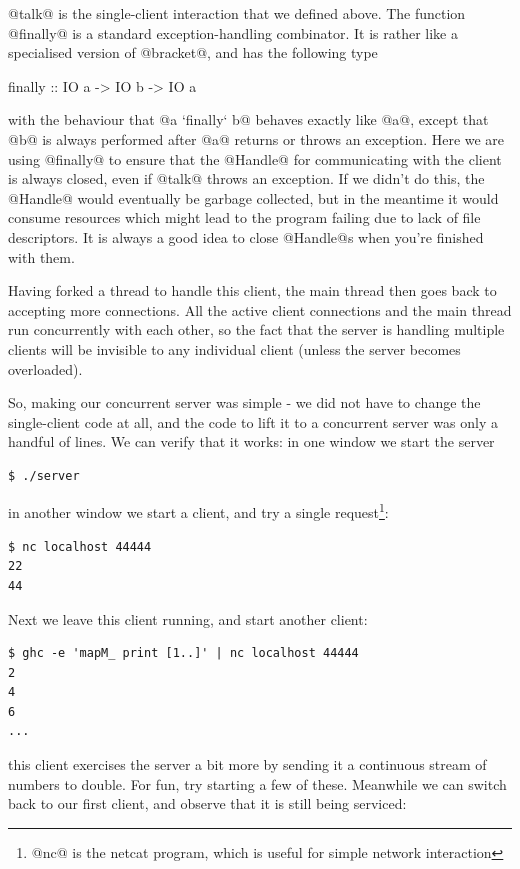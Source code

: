 \noindent @talk@ is the single-client interaction that we defined
above.  The function @finally@ is a standard exception-handling
combinator.  It is rather like a specialised version
of @bracket@, and has the following type

\begin{haskell}
finally :: IO a -> IO b -> IO a
\end{haskell}

\noindent with the behaviour that @a `finally` b@ behaves exactly like
@a@, except that @b@ is always performed after @a@ returns or throws
an exception.  Here we are using @finally@ to ensure that the @Handle@
for communicating with the client is always closed, even if @talk@
throws an exception.  If we didn't do this, the @Handle@ would
eventually be garbage collected, but in the meantime it would consume
resources which might lead to the program failing due to lack of file
descriptors.  It is always a good idea to close @Handle@s when you're
finished with them.

Having forked a thread to handle this client, the main thread then
goes back to accepting more connections.  All the active client
connections and the main thread run concurrently with each other, so
the fact that the server is handling multiple clients will be
invisible to any individual client (unless the server becomes
overloaded).

So, making our concurrent server was simple - we did not have to
change the single-client code at all, and the code to lift it to a
concurrent server was only a handful of lines.  We can verify that it
works: in one window we start the server

\begin{verbatim}
$ ./server
\end{verbatim}

\noindent in another window we start a client, and try a single
request\footnote{@nc@ is the netcat program, which is useful for simple network
  interaction}:

\begin{verbatim}
$ nc localhost 44444
22
44
\end{verbatim}

\noindent Next we leave this client running, and start another client:

\begin{verbatim}
$ ghc -e 'mapM_ print [1..]' | nc localhost 44444
2
4
6
...
\end{verbatim}

\noindent this client exercises the server a bit more by sending it a
continuous stream of numbers to double.  For fun, try starting a few
of these.  Meanwhile we can switch back to our first client, and
observe that it is still being serviced:

